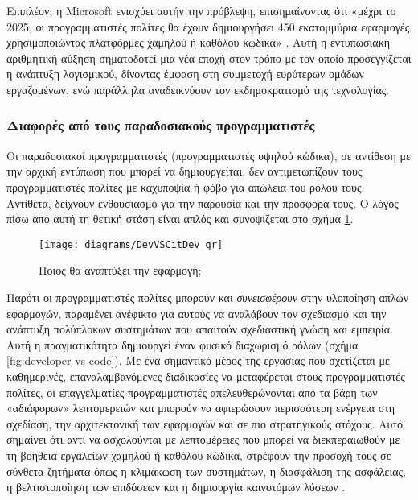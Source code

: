                 Επιπλέον, η Microsoft ενισχύει αυτήν την πρόβλεψη, επισημαίνοντας ότι «μέχρι το 2025, οι προγραμματιστές πολίτες θα έχουν δημιουργήσει 450 εκατομμύρια εφαρμογές χρησιμοποιώντας πλατφόρμες χαμηλού ή καθόλου κώδικα» \cite{cnbcNextFrontier}. Αυτή η εντυπωσιακή αριθμητική αύξηση σηματοδοτεί μια νέα εποχή στον τρόπο με τον οποίο προσεγγίζεται η ανάπτυξη λογισμικού, δίνοντας έμφαση στη συμμετοχή ευρύτερων ομάδων εργαζομένων, ενώ παράλληλα αναδεικνύουν τον εκδημοκρατισμό της τεχνολογίας.

                \subsubsection{Διαφορές από τους παραδοσιακούς προγραμματιστές}
                    Οι παραδοσιακοί προγραμματιστές (προγραμματιστές υψηλού κώδικα), σε αντίθεση με την αρχική εντύπωση που μπορεί να δημιουργείται, δεν αντιμετωπίζουν τους προγραμματιστές πολίτες με καχυποψία ή φόβο για απώλεια του ρόλου τους. Αντίθετα, δείχνουν ενθουσιασμό για την παρουσία και την προσφορά τους. Ο λόγος πίσω από αυτή τη θετική στάση είναι απλός και συνοψίζεται στο σχήμα \ref{fig:DevVSCitDev}.

                    \begin{figure}[h!] \noindent \centering
                        \texttt{[image: diagrams/DevVSCitDev\_gr]}
                        \caption{Ποιος θα αναπτύξει την εφαρμογή; \cite{LowCodeSimon}}
                        \label{fig:DevVSCitDev}
                    \end{figure}

                    Παρότι οι προγραμματιστές πολίτες μπορούν και \textit{συνεισφέρουν} στην υλοποίηση απλών εφαρμογών, παραμένει ανέφικτο για αυτούς να αναλάβουν τον σχεδιασμό και την ανάπτυξη πολύπλοκων συστημάτων που απαιτούν σχεδιαστική γνώση και εμπειρία. Αυτή η πραγματικότητα δημιουργεί έναν φυσικό διαχωρισμό ρόλων (σχήμα \ref{fig:developer-vs-code}). Με ένα σημαντικό μέρος της εργασίας που σχετίζεται με καθημερινές, επαναλαμβανόμενες διαδικασίες να μεταφέρεται στους προγραμματιστές πολίτες, οι επαγγελματίες προγραμματιστές απελευθερώνονται από τα βάρη των «αδιάφορων» λεπτομερειών και μπορούν να αφιερώσουν περισσότερη ενέργεια στη σχεδίαση, την αρχιτεκτονική των εφαρμογών και σε πιο στρατηγικούς στόχους. Αυτό σημαίνει ότι αντί να ασχολούνται με λεπτομέρειες που μπορεί να διεκπεραιωθούν με τη βοήθεια εργαλείων χαμηλού ή καθόλου κώδικα, στρέφουν την προσοχή τους σε σύνθετα ζητήματα όπως η κλιμάκωση των συστημάτων, η διασφάλιση της ασφάλειας, η βελτιστοποίηση των επιδόσεων και η δημιουργία καινοτόμων λύσεων \cite{Sahay2020}.

